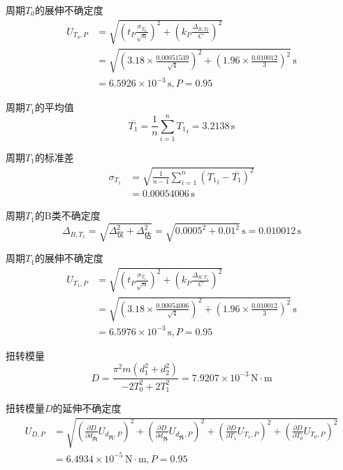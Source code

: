 \documentclass[12pt,a4paper]{article}
\begin{document}
    周期$T_0$的展伸不确定度
    \[
        \begin{aligned}
            U_{T_0,P}&=\sqrt{\left(t_P\frac{\sigma_{T_0}}{\sqrt{n}}\right)^2+\left(k_P\frac{\Delta_{B,T_0}}{C}\right)^2}\\
            &=\sqrt{\left(3.18\times\frac{0.00051539}{\sqrt{4}}\right)^2+\left(1.96\times\frac{0.010012}{3}\right)^2}\,\mathrm{s}\\
            &=6.5926 \times 10^{-3}\,\mathrm{s},P=0.95
        \end{aligned}
    \]

    周期$T_1$的平均值
    \[
        \overline{T_1}=\frac{1}{n}\sum_{i=1}^{n}{T_1}_i=3.2138\,\mathrm{s}
    \]
    
    周期$T_1$的标准差
    \[
        \begin{aligned}
            \sigma_{T_1}&=\sqrt{\frac{1}{n-1}\sum_{i=1}^n\left({T_1}_i-\overline{T_1}\right)^2}\\
            &=0.00054006\,\mathrm{s}
        \end{aligned}
    \]

    周期$T_1$的B类不确定度
    \[
        \Delta_{B,T_1}=\sqrt{\Delta_\text{仪}^2+\Delta_\text{估}^2}=\sqrt{0.0005^2+0.01^2}\,\mathrm{s}=0.010012\,\mathrm{s}
    \]

    周期$T_1$的展伸不确定度
    \[
        \begin{aligned}
            U_{T_1,P}&=\sqrt{\left(t_P\frac{\sigma_{T_1}}{\sqrt{n}}\right)^2+\left(k_P\frac{\Delta_{B,T_1}}{C}\right)^2}\\
            &=\sqrt{\left(3.18\times\frac{0.00054006}{\sqrt{4}}\right)^2+\left(1.96\times\frac{0.010012}{3}\right)^2}\,\mathrm{s}\\
            &=6.5976 \times 10^{-3}\,\mathrm{s},P=0.95
        \end{aligned}
    \]

    扭转模量
    \[
        D=\frac{\pi^{2} m \left(d_{1}^{2} + d_{2}^{2}\right)}{- 2 T_{0}^{2} + 2 T_{1}^{2}}=7.9207 \times 10^{-3}\,\mathrm{N·m}
    \]

    扭转模量$D$的延伸不确定度
    \[
        \begin{aligned}
            U_{D,P}&=\sqrt{\left(\frac{\partial D}{\partial d_\text{内}}U_{d_\text{内},P}\right)^2+\left(\frac{\partial D}{\partial d_\text{外}}U_{d_\text{外},P}\right)^2+\left(\frac{\partial D}{\partial T_1}U_{T_1,P}\right)^2+\left(\frac{\partial D}{\partial T_0}U_{T_0,P}\right)^2}\\
            &=6.4934 \times 10^{-5}\,\mathrm{N·m},P=0.95
        \end{aligned}
    \]
\end{document}

